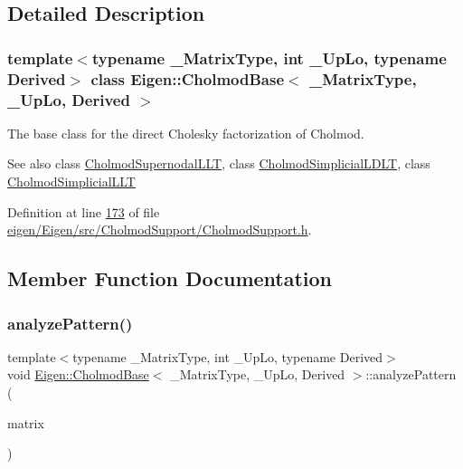\subsection{Detailed Description}
\subsubsection*{template$<$typename \+\_\+\+Matrix\+Type, int \+\_\+\+Up\+Lo, typename Derived$>$\newline
class Eigen\+::\+Cholmod\+Base$<$ \+\_\+\+Matrix\+Type, \+\_\+\+Up\+Lo, Derived $>$}

The base class for the direct Cholesky factorization of Cholmod. 

\begin{DoxySeeAlso}{See also}
class \hyperlink{class_eigen_1_1_cholmod_supernodal_l_l_t}{Cholmod\+Supernodal\+L\+LT}, class \hyperlink{class_eigen_1_1_cholmod_simplicial_l_d_l_t}{Cholmod\+Simplicial\+L\+D\+LT}, class \hyperlink{class_eigen_1_1_cholmod_simplicial_l_l_t}{Cholmod\+Simplicial\+L\+LT} 
\end{DoxySeeAlso}


Definition at line \hyperlink{eigen_2_eigen_2src_2_cholmod_support_2_cholmod_support_8h_source_l00173}{173} of file \hyperlink{eigen_2_eigen_2src_2_cholmod_support_2_cholmod_support_8h_source}{eigen/\+Eigen/src/\+Cholmod\+Support/\+Cholmod\+Support.\+h}.



\subsection{Member Function Documentation}
\mbox{\label{class_eigen_1_1_cholmod_base_a5ac967e9f4ccfc43ca9e610b89232c24}} 
\subsubsection{\texorpdfstring{analyze\+Pattern()}{analyzePattern()}\hspace{0.1cm}{\footnotesize\ttfamily [1/2]}}
{\footnotesize\ttfamily template$<$typename \+\_\+\+Matrix\+Type, int \+\_\+\+Up\+Lo, typename Derived$>$ \\
void \hyperlink{class_eigen_1_1_cholmod_base}{Eigen\+::\+Cholmod\+Base}$<$ \+\_\+\+Matrix\+Type, \+\_\+\+Up\+Lo, Derived $>$\+::analyze\+Pattern (\begin{DoxyParamCaption}\item[{const Matrix\+Type \&}]{matrix }\end{DoxyParamCaption})\hspace{0.3cm}{\ttfamily [inline]}}

